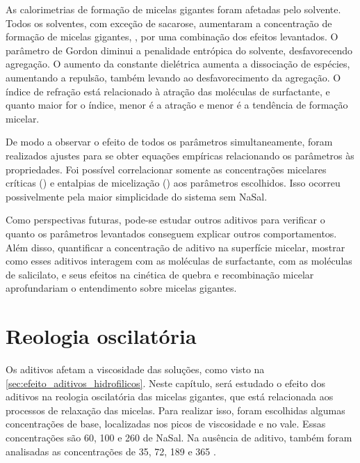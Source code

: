 		As calorimetrias de formação de micelas gigantes foram afetadas pelo solvente. Todos os solventes, com exceção de sacarose, aumentaram a concentração de formação de micelas gigantes, \cwlm, por uma combinação dos efeitos levantados. O parâmetro de Gordon diminui a penalidade entrópica do solvente, desfavorecendo agregação. O aumento da constante dielétrica aumenta a dissociação de espécies, aumentando a repulsão, também levando ao desfavorecimento da agregação. O índice de refração está relacionado à atração das moléculas de surfactante, e quanto maior for o índice, menor é a atração e menor é a tendência de formação micelar.
		
		De modo a observar o efeito de todos os parâmetros simultaneamente, foram realizados ajustes para se obter equações empíricas relacionando os parâmetros às propriedades. Foi possível correlacionar somente as concentrações micelares críticas (\cmc) e entalpias de micelização (\DHmic) aos parâmetros escolhidos. Isso ocorreu possivelmente pela maior simplicidade do sistema sem NaSal.
		
		Como perspectivas futuras, pode-se estudar outros aditivos para verificar o quanto os parâmetros levantados conseguem explicar outros comportamentos. Além disso, quantificar a concentração de aditivo na superfície micelar, mostrar como esses aditivos interagem com as moléculas de surfactante, com as moléculas de salicilato, e seus efeitos na cinética de quebra e recombinação micelar aprofundariam o entendimento sobre micelas gigantes.
		
		
	\chapter{Reologia oscilatória} 
	\label{sec:reologia_oscilatoria}

		Os aditivos afetam a viscosidade das soluções, como visto na \autoref{sec:efeito_aditivos_hidrofilicos}. Neste capítulo, será estudado o efeito dos aditivos na reologia oscilatória das micelas gigantes, que está relacionada aos processos de relaxação das micelas. Para realizar isso, foram escolhidas algumas concentrações de base, localizadas nos picos de viscosidade e no vale. Essas concentrações são 60, 100 e 260 \mM{} de NaSal. Na ausência de aditivo, também foram analisadas as concentrações de 35, 72, 189 e 365 \mM.
		
